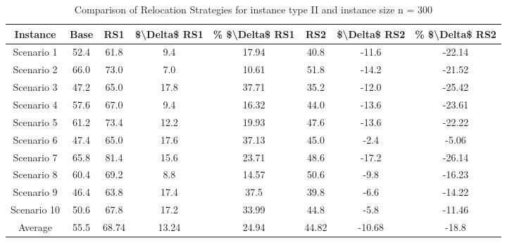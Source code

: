 \begin{table}[H]
\centering
\begin{tabular}{cccccccc}
  \hline
  \textbf{Instance} & \textbf{Base} & \textbf{RS1} & \textbf{\$\textbackslash{}Delta\$  RS1} & \textbf{\% \$\textbackslash{}Delta\$  RS1} & \textbf{RS2} & \textbf{\$\textbackslash{}Delta\$  RS2} & \textbf{\% \$\textbackslash{}Delta\$  RS2} \\\hline
  Scenario 1 & 52.4 & 61.8 & 9.4 & 17.94 & 40.8 & -11.6 & -22.14 \\
  Scenario 2 & 66.0 & 73.0 & 7.0 & 10.61 & 51.8 & -14.2 & -21.52 \\
  Scenario 3 & 47.2 & 65.0 & 17.8 & 37.71 & 35.2 & -12.0 & -25.42 \\
  Scenario 4 & 57.6 & 67.0 & 9.4 & 16.32 & 44.0 & -13.6 & -23.61 \\
  Scenario 5 & 61.2 & 73.4 & 12.2 & 19.93 & 47.6 & -13.6 & -22.22 \\
  Scenario 6 & 47.4 & 65.0 & 17.6 & 37.13 & 45.0 & -2.4 & -5.06 \\
  Scenario 7 & 65.8 & 81.4 & 15.6 & 23.71 & 48.6 & -17.2 & -26.14 \\
  Scenario 8 & 60.4 & 69.2 & 8.8 & 14.57 & 50.6 & -9.8 & -16.23 \\
  Scenario 9 & 46.4 & 63.8 & 17.4 & 37.5 & 39.8 & -6.6 & -14.22 \\
  Scenario 10 & 50.6 & 67.8 & 17.2 & 33.99 & 44.8 & -5.8 & -11.46 \\
  Average & 55.5 & 68.74 & 13.24 & 24.94 & 44.82 & -10.68 & -18.8 \\\hline
\end{tabular}
\caption{Comparison of Relocation Strategies for instance type II and instance size n = 300}
\label{tab:wait:resrelocation-comparison_II_300}
\end{table}
